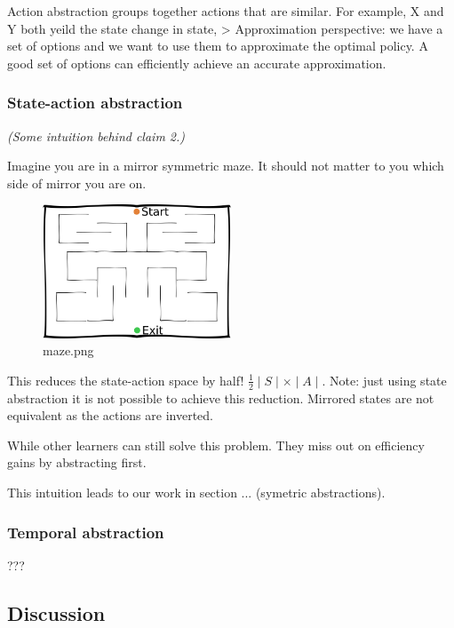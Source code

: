 Action abstraction groups together actions that are similar. For
example, X and Y both yeild the state change in state, \textgreater{}
Approximation perspective: we have a set of options and we want to use
them to approximate the optimal policy. A good set of options can
efficiently achieve an accurate approximation.

\subsubsection{State-action abstraction}

\emph{(Some intuition behind claim 2.)}

Imagine you are in a mirror symmetric maze. It should not matter to you
which side of mirror you are on.

\begin{figure}
\centering
\includegraphics[width=0.5\textwidth,height=0.5\textheight]{../../pictures/drawings/maze.png}
\caption{maze.png}
\end{figure}

This reduces the state-action space by half!
\(\frac{1}{2}\mid S \mid \times \mid A \mid\). Note: just using state
abstraction it is not possible to achieve this reduction. Mirrored
states are not equivalent as the actions are inverted.

While other learners can still solve this problem. They miss out on
efficiency gains by abstracting first.

This intuition leads to our work in section ... (symetric abstractions).

\subsubsection{Temporal abstraction}

???


\subsection{Discussion}


